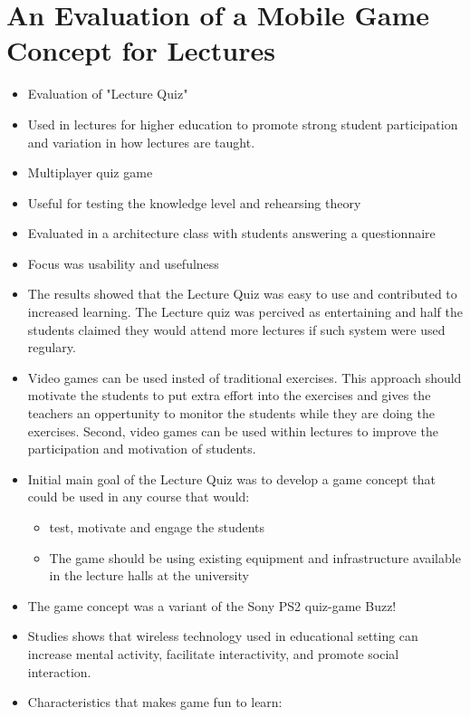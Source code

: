 \chapter*{An Evaluation of a Mobile Game Concept for Lectures}

  \begin{itemize}
    \item Evaluation of "Lecture Quiz"
    \item Used in lectures for higher education to promote strong student participation and variation in how lectures are taught.
    \item Multiplayer quiz game
    \item Useful for testing the knowledge level and rehearsing theory
    \item Evaluated in a architecture class with students answering a questionnaire
    \item Focus was usability and usefulness
    \item The results showed that the Lecture Quiz was easy to use and contributed to increased learning. The Lecture quiz was percived as entertaining and half the students claimed they would attend more lectures if such system were used regulary. 
    \item Video games can be used insted of traditional exercises. This approach should motivate the students to put extra effort into the exercises and gives the teachers an oppertunity to monitor the students while they are doing the exercises. Second, video games can be used within lectures to improve the participation and motivation of students. 
    \item Initial main goal of the Lecture Quiz was to develop a game concept that could be used in any course that would: 
      \begin{itemize}
          \item test, motivate and engage the students
          \item The game should be using existing equipment and infrastructure available in the lecture halls at the university
      \end{itemize} 
    \item The game concept was a variant of the Sony PS2 quiz-game Buzz!
    \item Studies shows that wireless technology used in educational setting can increase mental activity, facilitate interactivity, and promote social interaction. 
    \item Characteristics that makes game fun to learn: 

\end{itemize}
